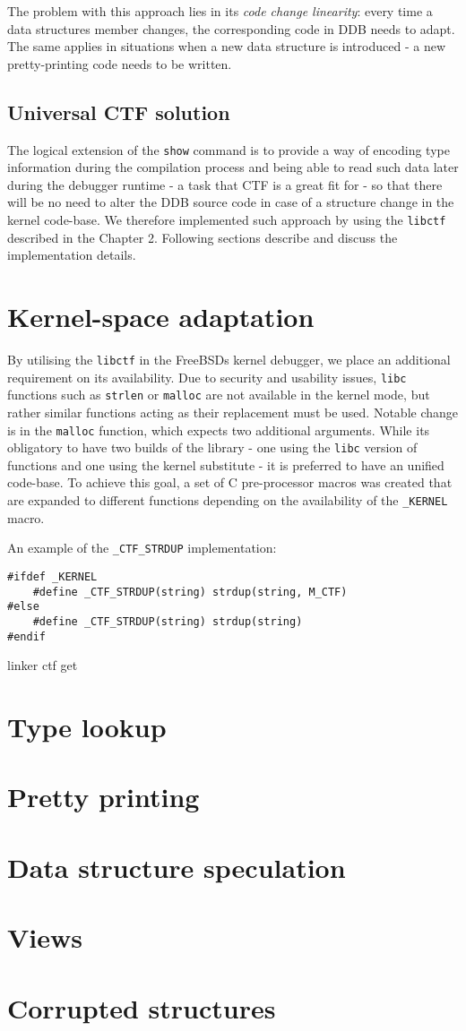 The problem with this approach lies in its {\it code change linearity}: every
time a data structures member changes, the corresponding code in DDB needs to
adapt. The same applies in situations when a new data structure is introduced -
a new pretty-printing code needs to be written.

\subsection{Universal CTF solution}
The logical extension of the {\tt show} command is to provide a way of encoding
type information during the compilation process and being able to read such
data later during the debugger runtime - a task that CTF is a great fit for -
so that there will be no need to alter the DDB source code in case of a
structure change in the kernel code-base. We therefore implemented such
approach by using the {\tt libctf} described in the Chapter 2. Following
sections describe and discuss the implementation details.

\section{Kernel-space adaptation}
By utilising the {\tt libctf} in the FreeBSDs kernel debugger, we place an
additional requirement on its availability. Due to security and usability
issues, {\tt libc} functions such as {\tt strlen} or {\tt malloc} are not
available in the kernel mode, but rather similar functions acting as their
replacement must be used. Notable change is in the {\tt malloc} function, which
expects two additional arguments. While its obligatory to have two builds of
the library - one using the {\tt libc} version of functions and one using the
kernel substitute - it is preferred to have an unified code-base. To achieve
this goal, a set of C pre-processor macros was created that are expanded to
different functions depending on the availability of the {\tt \_KERNEL} macro.

An example of the {\tt \_CTF\_STRDUP} implementation:
\begin{verbatim}
#ifdef _KERNEL
	#define _CTF_STRDUP(string) strdup(string, M_CTF)
#else
	#define _CTF_STRDUP(string) strdup(string)
#endif
\end{verbatim}

linker ctf get

\section{Type lookup}
\section{Pretty printing}
\section{Data structure speculation}
\section{Views}
\section{Corrupted structures}

